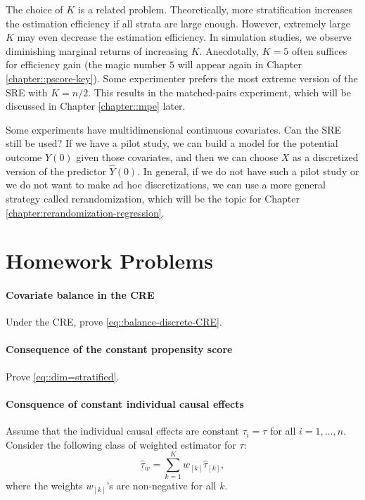 The choice of $K$ is a related problem. Theoretically, more stratification increases the estimation efficiency if all strata are large enough. However, extremely large $K$ may even decrease the estimation efficiency. In simulation studies, we observe diminishing marginal returns of increasing $K$. Anecdotally, $K = 5$ often suffices for efficiency gain (the magic number $5$ will appear again in Chapter \ref{chapter::pscore-key}). Some experimenter prefers the most extreme version of the SRE with $K=n/2$. This results in the matched-pairs experiment, which will be discussed in Chapter \ref{chapter::mpe} later.  


Some experiments have multidimensional continuous covariates. Can the SRE still be used? If we have a pilot study, we can build a model for the potential outcome $Y(0)$ given those covariates, and then we can choose $X$ as a discretized version of the predictor $\hat{Y}(0)$. In general, if we do not have such a pilot study or we do not want to make ad hoc discretizations, we can use a more general strategy called rerandomization, which will be the topic for Chapter \ref{chapter:rerandomization-regression}. 

 
 
 \section{Homework Problems}
 
 
  \paragraph{Covariate balance in the CRE}\label{hw::balance-discrete-CRE}
  
 Under the CRE, prove \eqref{eq::balance-discrete-CRE}. 
 
 \paragraph{Consequence of the constant propensity score}
\label{hw::sre-additional-neyman}

Prove \eqref{eq::dim=stratified}. 


\paragraph{Consquence of constant individual causal effects}

Assume that the individual causal effects are constant $\tau_i = \tau$ for all $i=1,\ldots, n$. 
Consider the following class of weighted estimator for $\tau$:
$$
\hat{\tau}_w = \sum_{k=1}^K  w_{[k]}  \hat{\tau}_{[k]} ,
$$
where the weights $w_{[k]}  $'s are non-negative for all $k$.

